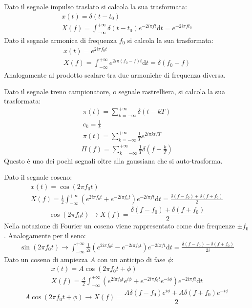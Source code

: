 \documentclass{article}
\newcommand{\df}{\mathrm{d}}
\numberwithin{equation}{subsection}
\begin{document}
Dato il segnale impulso traslato si calcola la sua trasformata:
\begin{gather*}
    x(t)=\delta (t-t_0)\\
    X(f)=\displaystyle\int_{-\infty}^{+\infty}\delta(t-t_0)e^{-2i\pi ft}\df t=e^{-2i\pi ft_0}
\end{gather*}
Dato il segnale armonica di frequenza $f_0$ si calcola la sua trasformata:
\begin{gather*}
    x(t)=e^{2i\pi f_0t}\\
    X(f)=\displaystyle\int_{-\infty}^{+\infty}e^{2i\pi(f_0-f)t}\df t=\delta(f_0-f)
\end{gather*}
Analogamente al prodotto scalare tra due armoniche di frequenza diversa. 


Dato il segnale treno campionatore, o segnale rastrelliera, si calcola la sua trasformata:
\begin{gather*}
    \pi(t)=\displaystyle\sum_{k=-\infty}^{+\infty}\delta(t-kT)\\
    c_k=\displaystyle\frac{1}{k}\\
    \pi(t)=\displaystyle\sum_{k=-\infty}^{+\infty}\frac{1}{T}e^{2i\pi kt/T}
\end{gather*}
\begin{gather}
    \Pi(f)=\displaystyle\sum_{k=-\infty}^{+\infty}\frac{1}{T}\delta\left(f-\frac{k}{T}\right)
\end{gather}
Questo è uno dei pochi segnali oltre alla gaussiana che si auto-trasforma. 


Dato il segnale coseno:
\begin{gather*}
    x(t)=\cos(2\pi f_0t)\\
    X(f)=\displaystyle\frac{1}{2}\int_{-\infty}^{+\infty}\left(e^{2i\pi f_0t}+e^{-2i\pi f_0t}\right)e^{-2i\pi ft}\df t=\frac{\delta(f-f_0)+\delta(f+f_0)}{2}
\end{gather*}
\begin{equation}
    \cos(2\pi f_0t)\rightarrow X(f)=\displaystyle\frac{\delta(f-f_0)+\delta(f+f_0)}{2}
\end{equation}
Nella notazione di Fourier un coseno viene rappresentato come due frequenze $\pm f_0$. 
Analogamente per il seno:
\begin{gather}
    \sin(2\pi f_0t)\to\displaystyle\int_{-\infty}^{+\infty}\frac{1}{2i}(e^{2i\pi f_0t}-e^{-2i\pi f_0t})e^{-2i\pi ft}\df t=\frac{\delta (f-f_0)-\delta(f+f_0)}{2i}
\end{gather}
Dato un coseno di ampiezza $A$ con un anticipo di fase $\phi$: 
\begin{gather*}
    x(t)=A\cos(2\pi f_0t+\phi)\\
    X(f)=\displaystyle\frac{A}{2}\int_{-\infty}^{+\infty}\left(e^{2i\pi f_0t}e^{i\phi}+e^{-2i\pi f_0t}e^{-i\phi}\right)e^{-2i\pi ft}\df t
\end{gather*}
\begin{equation}
    A\cos(2\pi f_0t+\phi)\to X(f)=\frac{A\delta(f-f_0)e^{i\phi}+A\delta(f+f_0)e^{-i\phi}}{2}
\end{equation}
\end{document}

